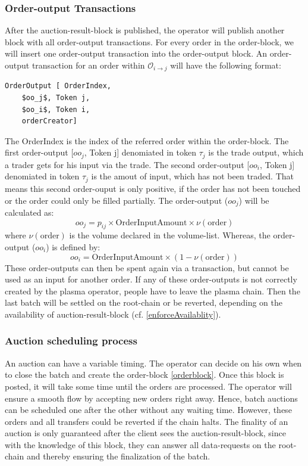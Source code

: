 \documentclass[11pt,parskip=full]{scrartcl}%
\def\pO{\mathcal{O}}
\def\ra{\rightarrow}
\begin{document}
\subsubsection{Order-output Transactions}
After the auction-result-block is published, the operator will publish another block with all order-output transactions. For every order in the order-block, we will insert one order-output transaction into the order-output block. 
An order-output transaction for an order within $\pO_{i\ra j}$ will have the following format:
\begin{lstlisting}
OrderOutput [ OrderIndex,
    $oo_j$, Token j,
    $oo_i$, Token i,
    orderCreator]
\end{lstlisting}
The OrderIndex is the index of the referred order within the order-block.
The first order-output [$oo_j$, Token j] denomiated in token $\tau_j$ is the trade output, which a trader gets for his input via the trade. 
The second order-output [$oo_i$, Token j] denomiated in token $\tau_j$ is the amout of input, which has not been traded. That means this second order-ouput is only positive, if the order has not been touched or the order could only be filled partially.
The order-output ($oo_j$) will be calculated as:
\begin{equation}
  oo_j = p_{ij} \times \text{OrderInputAmount} \times \nu(\text{order}) 
    \label{fee_equ}
\end{equation}
where $\nu(\text{order})$ is the volume declared in the volume-list.  
Whereas, the order-output ($oo_i$) is defined by:
\begin{equation}
  oo_i =  \text{OrderInputAmount}\times (1 - \nu(\text{order}))
\end{equation}
These order-outputs can then be spent again via a transaction, but cannot be used as an input for another order. 
If any of these order-outputs is not correctly created by the plasma operator, people have to leave the plasma chain. 
Then the last batch will be settled on the root-chain or be reverted, depending on the availability of auction-result-block (cf. \ref{enforceAvailablity}). 



\subsubsection{Auction scheduling process}

An auction can have a variable timing. 
The operator can decide on his own when to close the batch and create the order-block \ref{orderblock}. 
Once this block is posted, it will take some time until the orders are processed. 
The operator will ensure a smooth flow by accepting new orders right away. 
Hence, batch auctions can be scheduled one after the other without any waiting time. 
However, these orders and all transfers could be reverted if the chain halts. 
The finality of an auction is only guaranteed after the client sees the auction-result-block, since with the knowledge of this block, they can answer all data-requests on the root-chain and thereby ensuring the finalization of the batch.
\end{document}
